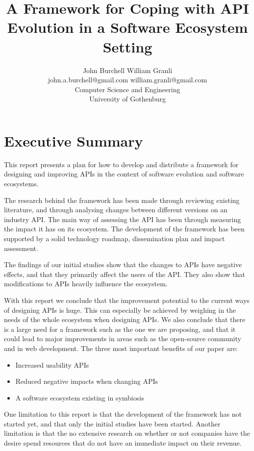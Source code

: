\documentclass{article}
\title{A Framework for Coping with API Evolution in a Software Ecosystem Setting}
\begin{document}
\author{John Burchell \qquad William Granli \\
		john.a.burchell@gmail.com \qquad william.granli@gmail.com \\
		Computer Science and Engineering  \\
		University of Gothenburg }

\maketitle
\section{Executive Summary}
This report presents a plan for how to develop and distribute a framework for designing and improving APIs in the context of software evolution and software ecosystems. 

The research behind the framework has been made through reviewing existing literature, and through analysing changes between  different versions on an industry API. The main way of assessing the API has been through measuring the impact it has on its ecosystem. The development of the framework has been supported by a solid technology roadmap, dissemination plan and impact assessment. 

The findings of our initial studies show that the changes to APIs have negative effects, and that they primarily affect the users of the API. They also show that modifications to APIs heavily influence the ecosystem. 

With this report we conclude that the improvement potential to the current ways of designing APIs is huge. This can especially be achieved by weighing in the needs of the whole ecosystem when designing APIs. We also conclude that there is a large need for a framework such as the one we are proposing, and that it could lead to major improvements in areas such as the open-source community and in web development. The three most important benefits of our paper are: 

\begin{itemize}
\item Increased usability APIs
\item Reduced negative impacts when changing APIs
\item A software ecosystem existing in symbiosis
\end{itemize}

One limitation to this report is that the development of the framework has not started yet, and that only the initial studies have been started. Another limitation is that the no extensive research on whether or not companies have the desire spend resources that do not have an immediate impact on their revenue. 
\end{document}
